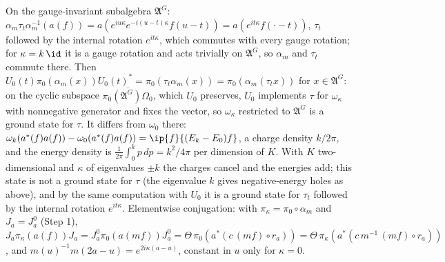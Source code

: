 On the gauge-invariant subalgebra $\mathfrak{A}^{G}$: $\alpha_{m}\tau_{t}\alpha_{m}^{-1}(a(f)) = a(e^{iu\kappa}e^{-i(u - t)\kappa}f(u - t)) = a(e^{it\kappa}f(\cdot - t))$, $\tau_{t}$ followed by the internal rotation $e^{it\kappa}$, which commutes with every gauge rotation; for $\kappa = k\,\id$ it is a gauge rotation and acts trivially on $\mathfrak{A}^{G}$, so $\alpha_{m}$ and $\tau_{t}$ commute there. Then $U_{0}(t)\pi_{0}(\alpha_{m}(x))U_{0}(t)^{*} = \pi_{0}(\tau_{t}\alpha_{m}(x)) = \pi_{0}(\alpha_{m}(\tau_{t}x))$ for $x \in \mathfrak{A}^{G}$: on the cyclic subspace $\overline{\pi_{0}(\mathfrak{A}^{G})\Omega_{0}}$, which $U_{0}$ preserves, $U_{0}$ implements $\tau$ for $\omega_{\kappa}$ with nonnegative generator and fixes the vector, so $\omega_{\kappa}$ restricted to $\mathfrak{A}^{G}$ is a ground state for $\tau$. It differs from $\omega_{0}$ there: $\omega_{k}(a^{*}(f)a(f)) - \omega_{0}(a^{*}(f)a(f)) = \ip{f}{(E_{k} - E_{0})f}$, a charge density $k/2\pi$, and the energy density is $\frac{1}{2\pi}\int_{0}^{k}p\,dp = k^{2}/4\pi$ per dimension of $K$. With $K$ two-dimensional and $\kappa$ of eigenvalues $\pm k$ the charges cancel and the energies add; this state is not a ground state for $\tau$ (the eigenvalue $k$ gives negative-energy holes as above), and by the same computation with $U_{0}$ it is a ground state for $\tau_{t}$ followed by the internal rotation $e^{it\kappa}$.
Elementwise conjugation: with $\pi_{\kappa} = \pi_{0}\circ\alpha_{m}$ and $J_{a} = J^{0}_{a}$ (Step 1), $J_{a}\pi_{\kappa}(a(f))J_{a} = J^{0}_{a}\pi_{0}(a(mf))J^{0}_{a} = \Theta\,\pi_{0}(a^{*}(c\,(mf)\circ r_{a})) = \Theta\,\pi_{\kappa}(a^{*}(c\,m^{-1}\,(mf)\circ r_{a}))$, and $m(u)^{-1}m(2a - u) = e^{2i\kappa(a - u)}$, constant in $u$ only for $\kappa = 0$.

